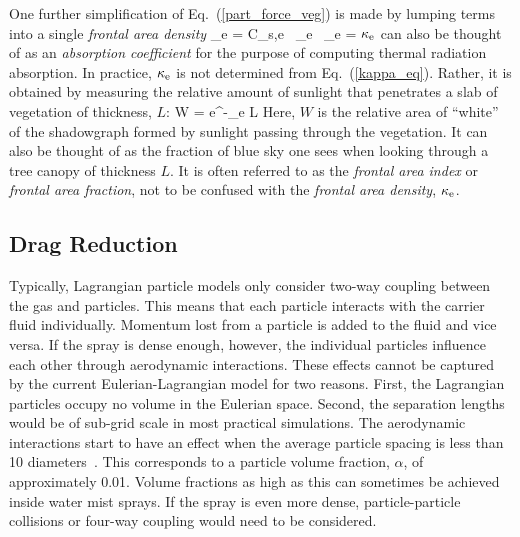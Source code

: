 One further simplification of Eq.~(\ref{part_force_veg}) is made by lumping terms into a single {\em frontal area density}
\be
   \kappa_{\rm e} = C_{\rm s,e} \,  \beta_{\rm e} \, \sigma_{\rm e} =  \label{kappa_eq}
\ee
$\kappa_{\rm e}$ can also be thought of as an {\em absorption coefficient} for the purpose of computing thermal radiation absorption. In practice, $\kappa_{\rm e}$ is not determined from Eq.~(\ref{kappa_eq}). Rather, it is obtained by measuring the relative amount of sunlight that penetrates a slab of vegetation of thickness, $L$:
\be
   W = {\rm e}^{-\kappa_{\rm e} L}
\ee
Here, $W$ is the relative area of ``white'' of the shadowgraph formed by sunlight passing through the vegetation. It can also be thought of as the fraction of blue sky one sees when looking through a tree canopy of thickness $L$. It is often referred to as the {\em frontal area index} or {\em frontal area fraction}, not to be confused with the {\em frontal area density}, $\kappa_{\rm e}$.

\subsection{Drag Reduction}
\label{sec:threeway}

Typically, Lagrangian particle models only consider two-way coupling between the gas and particles. This means that each particle interacts with the carrier fluid individually. Momentum lost from a particle is added to the fluid and vice versa. If the spray is dense enough, however, the individual particles influence each other through aerodynamic interactions. These effects cannot be captured by the current Eulerian-Lagrangian model for two reasons. First, the Lagrangian particles occupy no volume in the Eulerian space. Second, the separation lengths would be of sub-grid scale in most practical simulations. The aerodynamic interactions start to have an effect when the average particle spacing is less than 10 diameters~\cite{Prahl:1,Prahl:2}. This corresponds to a particle volume fraction, $\alpha$, of approximately 0.01. Volume fractions as high as this can sometimes be achieved inside water mist sprays. If the spray is even more dense, particle-particle collisions or four-way coupling would need to be considered.

